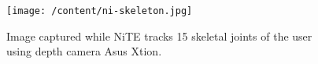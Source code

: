 \begin{figure}
	[h] \centering 
	\texttt{[image: /content/ni-skeleton.jpg]} \caption{Image captured while NiTE tracks 15 skeletal joints of the user using depth camera Asus Xtion. } \label{fg:ni:skeleton} 
\end{figure}
